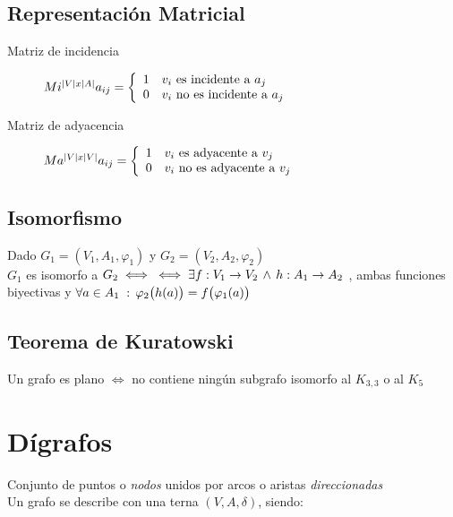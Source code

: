 \documentclass[a4paper,twocolumn]{article}
\numberwithin{equation}{section}
\numberwithin{figure}{section}
\numberwithin{table}{section}
\newcommand{\refa}[1]{}
\newcommand{\talque}{\;:\,} %
\begin{document}
\subsection{Representaci\'on Matricial}
\begin{description}
	\item[Matriz de incidencia] $Mi^{|V|x|A|} \\ a_{ij} = \left\{
\begin{array}{c l}
 1 & v_i\textup{ es incidente\refa{incidente} a } a_j\\
 0 & v_i\textup{ no es incidente\refa{incidente} a } a_j\\
\end{array}
\right.
$
    \item[Matriz de adyacencia]$Ma^{|V|x|V|} \\ a_{ij} = \left\{
\begin{array}{c l}
 1 & v_i\textup{ es adyacente\refa{adyacente} a } v_j\\
 0 & v_i\textup{ no es adyacente\refa{adyacente} a } v_j\\
\end{array}
\right.
$
\end{description}

\subsection{Isomorfismo}\label{isomorfo}
Dado $G_1 = (V_1, A_1, \varphi_1)$ y $G_2 = (V_2, A_2, \varphi_2)$ \\
$G_1$ es isomorfo a $G_2 \iff \\ \iff \exists f:V_1 \to V_2 \,\land \,h : A_1 \to A_2$ , ambas funciones biyectivas y $\forall a \in A_1 \talque \varphi_2\big{(} h(a) \big{)} = f\big{(} \varphi_1(a) \big{)}$

\subsection{Teorema de Kuratowski}
Un grafo es plano $\iff$ no contiene ning\'un subgrafo\refa{subgrafo} isomorfo\refa{isomorfo} al $K_{3,3}$ o al $K_5$


\section{D\'igrafos}
Conjunto de puntos o \emph{nodos} unidos por arcos o aristas \emph{direccionadas}\\
Un grafo se describe con una terna $(V,A,\delta )$, siendo:
\end{document}
